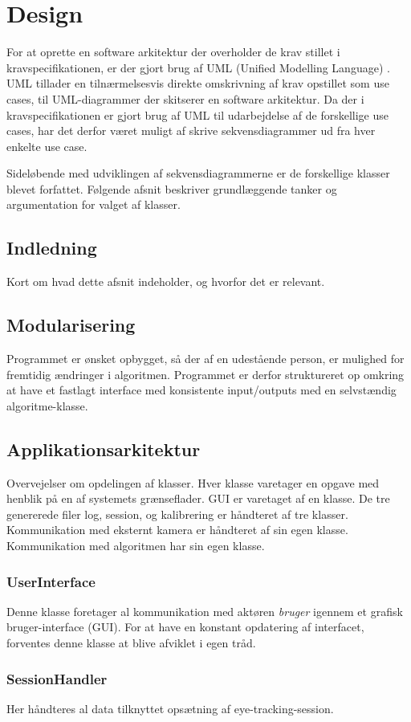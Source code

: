 \documentclass[rapport.tex]{subfiles}
\begin{document}
	\section{Design}
	For at oprette en software arkitektur der overholder de krav stillet i kravspecifikationen, er der gjort brug af UML (Unified Modelling Language) \cite{UMLurl}. UML tillader en tilnærmelsesvis direkte omskrivning af krav opstillet som use cases, til UML-diagrammer der skitserer en software arkitektur. 
	Da der i kravspecifikationen er gjort brug af UML til udarbejdelse af de forskellige use cases, har det derfor været muligt af skrive sekvensdiagrammer ud fra hver enkelte use case. 
	
	Sideløbende med udviklingen af sekvensdiagrammerne er de forskellige klasser blevet forfattet. Følgende afsnit beskriver grundlæggende tanker og argumentation for valget af klasser.
	\subsection{Indledning}
	Kort om hvad dette afsnit indeholder, og hvorfor det er relevant. 	
	\subsection{Modularisering}
	Programmet er ønsket opbygget, så der af en udestående person, er mulighed for fremtidig ændringer i algoritmen. Programmet er derfor struktureret op omkring at have et fastlagt interface med konsistente input/outputs med en selvstændig algoritme-klasse. 
	\subsection{Applikationsarkitektur}
	Overvejelser om opdelingen af klasser. Hver klasse varetager en opgave med henblik på en af systemets grænseflader. GUI er varetaget af en klasse. De tre genererede filer log, session, og kalibrering er håndteret af tre klasser. Kommunikation med eksternt kamera er håndteret af sin egen klasse. Kommunikation med algoritmen har sin egen klasse. 
		\subsubsection{UserInterface}
		Denne klasse foretager al kommunikation med aktøren \textit{bruger} igennem et grafisk bruger-interface (GUI). For at have en konstant opdatering af interfacet, forventes denne klasse at blive afviklet i egen tråd. 
		\subsubsection{SessionHandler}
		Her håndteres al data tilknyttet opsætning af eye-tracking-session. 
\end{document}
